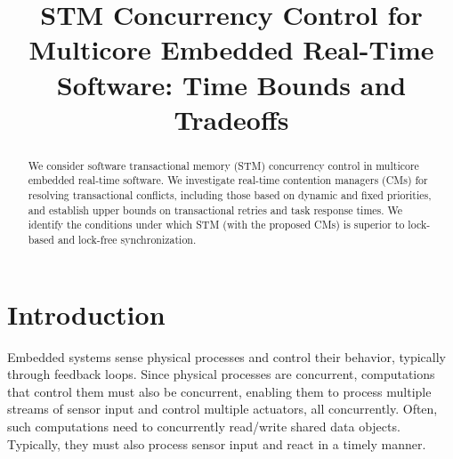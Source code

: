 \documentclass{sig-alternate}
\begin{document}
\title{STM Concurrency Control for Multicore Embedded Real-Time Software: Time Bounds and Tradeoffs%
}


\author{}


\maketitle

\begin{abstract}
We consider software transactional memory (STM) concurrency control in multicore embedded real-time software. We investigate real-time contention managers (CMs) for resolving transactional conflicts, including those based on dynamic and fixed priorities, and establish upper bounds on transactional retries and task response times. We identify the conditions under which STM (with the proposed CMs) is superior to lock-based and lock-free synchronization.

\end{abstract}

\section{Introduction}
\label{sec:intro}

Embedded systems sense physical processes and control their behavior, typically through feedback loops. Since physical processes are concurrent, computations that control them must also be concurrent, enabling them to process multiple streams of sensor input and control multiple actuators, all concurrently. Often, such computations need to concurrently read/write shared data objects. Typically, they must also process sensor input and react in a timely manner. 
\end{document}
